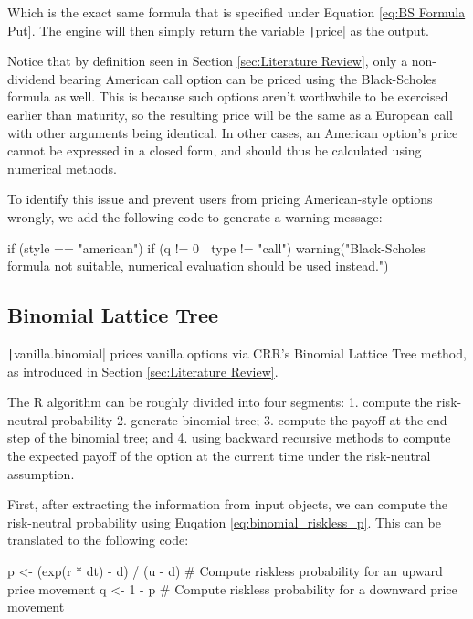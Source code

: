 Which is the exact same formula that is specified under Equation \ref{eq:BS Formula Put}. The engine will then simply return the variable \texttt|price| as the output.

Notice that by definition seen in Section \ref{sec:Literature Review}, only a non-dividend bearing American call option can be priced using the Black-Scholes formula as well. This is because such options aren't worthwhile to be exercised earlier than maturity, so the resulting price will be the same as a European call with other arguments being identical. In other cases, an American option's price cannot be expressed in a closed form, and should thus be calculated using numerical methods.

To identify this issue and prevent users from pricing American-style options wrongly, we add the following code to generate a warning message:

\begin{Rminted}
if (style == "american") {
    if (q != 0 | type != "call") {
        warning("Black-Scholes formula not suitable, numerical evaluation should be used instead.")
    }
}
\end{Rminted}

\subsection{Binomial Lattice Tree}

\texttt|vanilla.binomial| prices vanilla options via CRR's Binomial Lattice Tree method, as introduced in Section \ref{sec:Literature Review}.

The R algorithm can be roughly divided into four segments: 1. compute the risk-neutral probability 2. generate binomial tree; 3. compute the payoff at the end step of the binomial tree; and 4. using backward recursive methods to compute the expected payoff of the option at the current time under the risk-neutral assumption.

First, after extracting the information from input objects, we can compute the risk-neutral probability using Euqation \ref{eq:binomial_riskless_p}. This can be translated to the following code:

\begin{Rminted}
p <- (exp(r * dt) - d) / (u - d) # Compute riskless probability for an upward price movement
q <- 1 - p # Compute riskless probability for a downward price movement
\end{Rminted}

